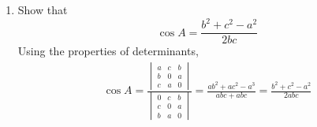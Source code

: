 \begin{enumerate}[label=\thesection.\arabic*.,ref=\thesection.\theenumi]
\begin{figure}[!ht]
\begin{center}
		\resizebox{\columnwidth}{!}{}
	\end{center}
	\caption{The cosine formula}
	\label{fig:tri_cosine_formula}	
\end{figure}
\solution From Fig. \ref{fig:tri_cosine_formula}, 
%
\begin{align}
	a &= x + y = b \cos C + c \cos B = \myvec{  \cos C & \cos B } \myvec{ b \\ c }
	\\
&=\myvec{0 & b & c } \myvec{ \cos A \\ \cos C \\ \cos B } 
\end{align}
%
Similarly,
%
\begin{align}
b &= c \cos A + a \cos C 
=\myvec{c & 0 & a } \myvec{ \cos A \\ \cos C \\ \cos B } 
	\\
c &= b \cos A + a \cos B
=\myvec{b & a & 0 } \myvec{ \cos A \\ \cos C \\ \cos B } 
\end{align}
%
The above equations can be expressed in matrix form as
\eqref{eq:tri_cos_mat}.

\item Show that 
\begin{equation}
\label{eq:tri_cos_form}
\cos A = \frac{b^2+c^2-a^2}{2bc}
\end{equation}
%
\solution 
Using the properties of determinants,
%
\begin{align}
\cos A = \frac{
\begin{vmatrix}
a & c & b \\
b & 0 & a \\
c & a & 0
\end{vmatrix}
	}
	{
\begin{vmatrix}
0 & c & b \\
c & 0 & a \\
b & a & 0
\end{vmatrix}
	}
	=\frac{ab^2 + ac^2 - a^3}{abc + abc} 
= \frac{b^2 + c^2 - a^2}{2abc}
\end{align}
\end{enumerate}
